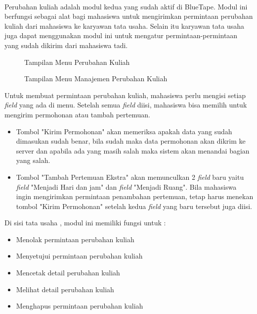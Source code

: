 \paragraph{} Perubahan kuliah adalah modul kedua yang sudah aktif di BlueTape. Modul ini berfungsi sebagai alat bagi mahasiswa untuk mengirimkan permintaan perubahan kuliah dari mahasiswa ke karyawan tata usaha. Selain itu karyawan tata usaha juga dapat menggunakan modul ini untuk mengatur permintaan-permintaan yang sudah dikirim dari mahasiswa tadi. 
\begin{figure} [H]
	\centering  
	\caption[Tampilan Menu Perubahan Kuliah]{Tampilan Menu Perubahan Kuliah} 
	\label{fig:flow-chart-CodeIgniter} 
\end{figure}
\begin{figure} [H]
	\centering  
	\caption[Tampilan Menu Manajemen Perubahan Kuliah]{Tampilan Menu Manajemen Perubahan Kuliah} 
	\label{fig:flow-chart-CodeIgniter} 
\end{figure}
Untuk membuat permintaan perubahan kuliah, mahasiswa perlu mengisi setiap \textit{field} yang ada di menu. Setelah semua \textit{field} diisi, mahasiswa bisa memilih untuk mengirim permohonan atau tambah pertemuan.
\begin{itemize}
	\item Tombol "Kirim Permohonan" akan memeriksa apakah data yang sudah dimasukan sudah benar, bila sudah maka data permohonan akan dikrim ke server dan apabila ada yang masih salah maka sistem akan menandai bagian yang salah.
	
	\item Tombol "Tambah Pertemuan Ekstra" akan memunculkan 2 \textit{field} baru yaitu \textit{field} "Menjadi Hari dan jam" dan \textit{field} "Menjadi Ruang". Bila mahasiswa ingin mengirimkan permintaan penambahan pertemuan, tetap harus menekan tombol "Kirim Permohonan" setelah kedua \textit{field} yang baru tersebut juga diisi.
\end{itemize}
Di sisi tata usaha , modul ini memiliki fungsi untuk :
\begin{itemize}
	\item Menolak permintaan perubahan kuliah
	\item Menyetujui permintaan perubahan kuliah
	\item Mencetak detail perubahan kuliah
	\item Melihat detail perubahan kuliah
	\item Menghapus permintaan perubahan kuliah
\end{itemize}
  
